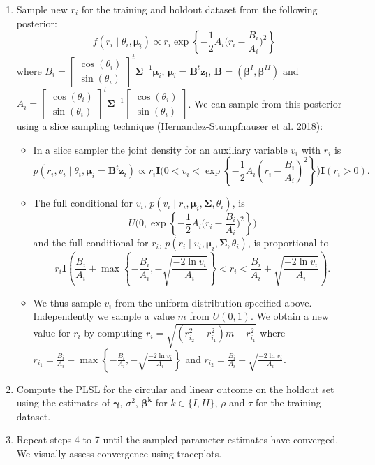 \documentclass[12pt,]{article}
\begin{document}
\begin{enumerate}
\item Sample new $r_i$ for the training and holdout dataset from the following posterior:
$$f(r_i \mid \theta_i, \boldsymbol{\mu}_i) \propto r_i \exp{\left\{-\frac{1}{2}A_i\bigg(r_i-\frac{B_i}{A_i}\bigg)^2\right\}}$$ 
where $B_i = \begin{bmatrix} \cos (\theta_i) \\ \sin (\theta_i)\end{bmatrix}^t\boldsymbol{\Sigma}^{-1}\boldsymbol{\mu}_i$, $\boldsymbol{\mu}_i = \boldsymbol{B}^t\boldsymbol{z_i}$, $\boldsymbol{B} = (\boldsymbol{\beta}^{I}, \boldsymbol{\beta}^{II})$ and $A_i = \begin{bmatrix} \cos (\theta_i) \\ \sin (\theta_i)\end{bmatrix}^t\boldsymbol{\Sigma}^{-1}\begin{bmatrix} \cos (\theta_i) \\ \sin (\theta_i)\end{bmatrix}$.
\noindent We can sample from this posterior using a slice sampling technique (Hernandez-Stumpfhauser et al. 2018):

\begin{itemize}
\item In a slice sampler the joint density for an auxiliary variable $v_{i}$ with $r_{i}$ is
$$p(r_{i}, v_{i}\mid \theta_{i}, \boldsymbol{\mu}_{i}=\boldsymbol{B}^t\boldsymbol{z}_{i}) \propto r_{i} \textbf{I}\bigg(0 < v_i < \exp\left\{ -\frac{1}{2} A_i\left(r_{i} - \frac{B_i}{A_i}\right)^2\right\}\bigg)\textbf{I}(r_i > 0).$$
\item The full conditional for $v_{i}$, $p(v_{i} \mid r_{i},\boldsymbol{\mu}_{i}, \boldsymbol{\Sigma}, \theta_{i})$, is
$$U\Bigg(0, \exp\left\{-\frac{1}{2}A_i\bigg(r_i -  \frac{B_{i}}{A_i}\bigg)^2\right\}\Bigg)$$
and the full conditional for $r_i$, $p(r_{i} \mid v_{i},\boldsymbol{\mu}_{i}, \boldsymbol{\Sigma}, \theta_{i})$, is proportional to
$$r_{i} \textbf{I}\left(\frac{B_i}{A_i} + \max\left\{-\frac{B_i}{A_i}, -\sqrt{\frac{-2\ln v_{i}}{A_i}}\right\} < r_{i} < \frac{B_i}{A_i} + \sqrt{\frac{-2\ln v_{i}}{A_i}}\right).$$
\item We thus sample $v_{i}$ from the uniform distribution specified above. Independently we sample a value $m$ from $U(0,1)$. We obtain a new value for $r_{i}$ by computing $r_{i} = \sqrt{(r_{i_{2}}^{2}-r_{i_{1}}^{2})m + r_{i_{1}}^{2}}$ where $r_{i_{1}}=\frac{B_i}{A_i} +\max\left\{-\frac{B_i}{A_i}, -\sqrt{\frac{-2\ln v_{i}}{A_i}}\right\}$ and $ r_{i_{2}}= \frac{B_i}{A_i} + \sqrt{\frac{-2\ln v_{i}}{A_i}}$.
\end{itemize}

\item Compute the PLSL for the circular and linear outcome on the holdout set using the estimates of $\boldsymbol{\gamma}$, $\sigma^2$, $\boldsymbol{\beta^{k}}$ for $k \in \{I,II\}$, $\rho$ and $\tau$ for the training dataset. 
\item Repeat steps 4 to 7 until the sampled parameter estimates have converged. We visually assess convergence using traceplots.
\end{enumerate}
\end{document}
